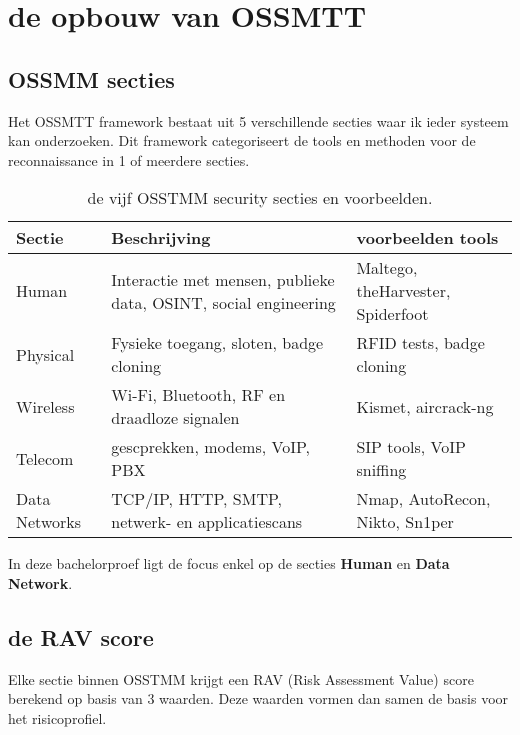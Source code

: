 \section{de opbouw van OSSMTT}

\subsection{OSSMM secties}
Het OSSMTT framework bestaat uit 5 verschillende secties waar ik ieder systeem kan onderzoeken.
Dit framework categoriseert de tools en methoden voor de reconnaissance in 1 of meerdere secties.

\begin{table}[H]
    \centering
    \footnotesize
    \begin{tabularx}{\linewidth}{l X l}
      \toprule
      \textbf{Sectie} & \textbf{Beschrijving} & \textbf{voorbeelden tools} \\
      \midrule
      Human         & Interactie met mensen, publieke data, OSINT, social engineering   & Maltego, theHarvester, Spiderfoot \\
      Physical      & Fysieke toegang, sloten, badge cloning                            & RFID tests, badge cloning \\
      Wireless      & Wi-Fi, Bluetooth, RF en draadloze signalen                        & Kismet, aircrack-ng \\
      Telecom       & gescprekken, modems, VoIP, PBX                                    & SIP tools, VoIP sniffing \\
      Data Networks & TCP/IP, HTTP, SMTP, netwerk- en applicatiescans                   & Nmap, AutoRecon, Nikto, Sn1per \\
      \bottomrule
    \end{tabularx}
    \caption[OSSTMM secties]{\label{tab:channels}de vijf OSSTMM security secties en voorbeelden.}
\end{table}

In deze bachelorproef ligt de focus enkel op de secties \textbf{Human} en \textbf{Data Network}.

\subsection{de RAV score}

Elke sectie binnen OSSTMM krijgt een RAV (Risk Assessment Value) score berekend op basis van 3 waarden.
Deze waarden vormen dan samen de basis voor het risicoprofiel.

